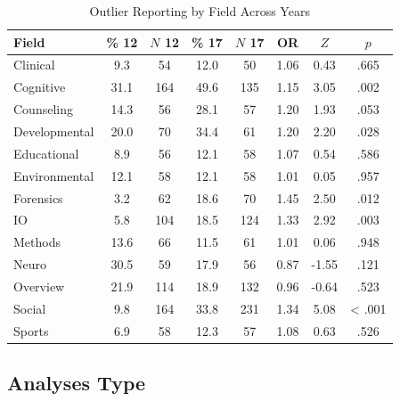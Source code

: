 \documentclass[english,man]{apa6}
\theoremstyle{definition}
\theoremstyle{definition}
\theoremstyle{definition}
\theoremstyle{remark}
\begin{document}
\begin{table}[tbp]
\begin{center}
\begin{threeparttable}
\caption{\label{tab:info-table}Outlier Reporting by Field Across Years}
\begin{tabular}{lccccccc}
\toprule
Field & \% 12 & $N$ 12 & \% 17 & $N$ 17 & OR & $Z$ & $p$\\
\midrule
Clinical & 9.3 & 54 & 12.0 & 50 & 1.06 & 0.43 & .665\\
Cognitive & 31.1 & 164 & 49.6 & 135 & 1.15 & 3.05 & .002\\
Counseling & 14.3 & 56 & 28.1 & 57 & 1.20 & 1.93 & .053\\
Developmental & 20.0 & 70 & 34.4 & 61 & 1.20 & 2.20 & .028\\
Educational & 8.9 & 56 & 12.1 & 58 & 1.07 & 0.54 & .586\\
Environmental & 12.1 & 58 & 12.1 & 58 & 1.01 & 0.05 & .957\\
Forensics & 3.2 & 62 & 18.6 & 70 & 1.45 & 2.50 & .012\\
IO & 5.8 & 104 & 18.5 & 124 & 1.33 & 2.92 & .003\\
Methods & 13.6 & 66 & 11.5 & 61 & 1.01 & 0.06 & .948\\
Neuro & 30.5 & 59 & 17.9 & 56 & 0.87 & -1.55 & .121\\
Overview & 21.9 & 114 & 18.9 & 132 & 0.96 & -0.64 & .523\\
Social & 9.8 & 164 & 33.8 & 231 & 1.34 & 5.08 & < .001\\
Sports & 6.9 & 58 & 12.3 & 57 & 1.08 & 0.63 & .526\\
\bottomrule
\end{tabular}
\end{threeparttable}
\end{center}
\end{table}

\subsection{Analyses Type}\label{analyses-type}
\end{document}
